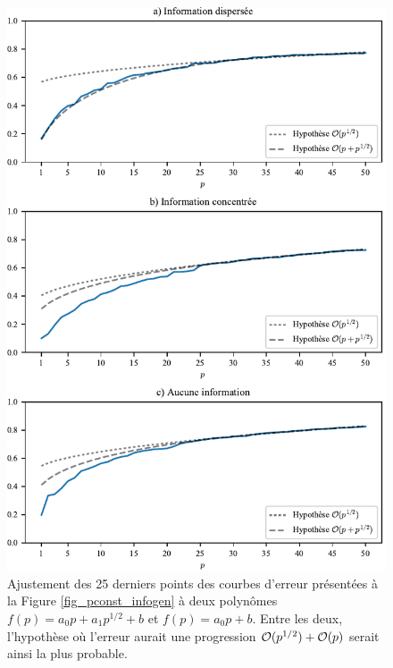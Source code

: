 \begin{figure}[h!]
  \centering
  \includegraphics[width=1\textwidth]{../experiments/fig/pconst_infogen_cf.pdf}
  \caption{Ajustement des 25 derniers points des courbes d'erreur présentées à la Figure
    \ref{fig_pconst_infogen} à deux polynômes $f(p) = a_0p + a_1 p^{1/2} + b$ et
    $f(p) = a_0p + b$. Entre les deux, l'hypothèse où l'erreur aurait une progression
    $\mathcal O(p^{1/2}) + \mathcal O(p)$ serait ainsi la plus probable.}
  \label{fig_pconst_infogen_cf}
\end{figure}

\clearpage




